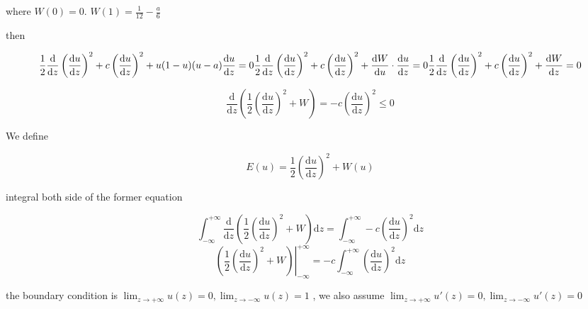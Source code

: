 \documentclass[
]{article}
\begin{document}
where $W(0) = 0$. $W(1) = \frac{1}{12} - \frac{a}{6}$

then

\begin{equation*}
\frac{1}{2}\frac{\mathrm{d}}{\mathrm{d}z}\left( \frac{\mathrm{d} u}{\mathrm{d} z} \right)^2 + c \left( \frac{\mathrm{d} u}{\mathrm{d} z} \right)^2 + u(1-u)(u-a) \frac{\mathrm{d} u}{\mathrm{d} z} = 0\\
\frac{1}{2}\frac{\mathrm{d}}{\mathrm{d}z}\left( \frac{\mathrm{d} u}{\mathrm{d} z} \right)^2 + c \left( \frac{\mathrm{d} u}{\mathrm{d} z} \right)^2 + \frac{\mathrm{d}W}{\mathrm{d}u} \cdot \frac{\mathrm{d} u}{\mathrm{d} z} = 0\\
\frac{1}{2}\frac{\mathrm{d}}{\mathrm{d}z}\left( \frac{\mathrm{d} u}{\mathrm{d} z} \right)^2 + c \left( \frac{\mathrm{d} u}{\mathrm{d} z} \right)^2 + \frac{\mathrm{d}W}{\mathrm{d} z} = 0
\end{equation*}

\begin{equation*}
\frac{\mathrm{d}}{\mathrm{d}z} \left( \frac{1}{2}\left( \frac{\mathrm{d} u}{\mathrm{d} z} \right)^2  + W \right) = - c \left( \frac{\mathrm{d} u}{\mathrm{d} z} \right)^2 \leq 0
\end{equation*}

We define

\begin{equation*}
E(u) = \frac{1}{2}\left( \frac{\mathrm{d} u}{\mathrm{d} z} \right)^2  + W(u)
\end{equation*}

integral both side of the former equation

\begin{equation*}
\int_{-\infty}^{+\infty} \frac{\mathrm{d}}{\mathrm{d}z} \left( \frac{1}{2}\left( \frac{\mathrm{d} u}{\mathrm{d} z} \right)^2  + W \right) \mathrm{d}z = 
\int_{-\infty}^{+\infty} - c \left( \frac{\mathrm{d} u}{\mathrm{d} z} \right)^2 \mathrm{d}z
\end{equation*}
\begin{equation*}
  \left.\left( \frac{1}{2}\left( \frac{\mathrm{d} u}{\mathrm{d} z} \right)^2  + W \right)\right|_{-\infty}^{+\infty} = 
- c \int_{-\infty}^{+\infty} \left( \frac{\mathrm{d} u}{\mathrm{d} z} \right)^2 \mathrm{d}z
\end{equation*}

the boundary condition is
$\lim_{z \rightarrow +\infty} u(z) = 0, \lim_{z \rightarrow -\infty} u(z) = 1$
, we also assume
$\lim_{z \rightarrow +\infty} u'(z) = 0, \lim_{z \rightarrow -\infty} u'(z) = 0$
\end{document}
